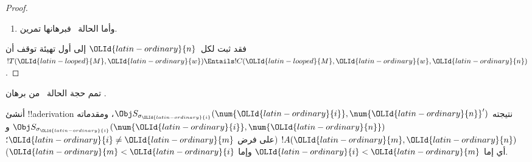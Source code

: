 \documentclass[../../../include/open-logic-section]{subfiles}
\begin{document}
\begin{proof}
\begin{enumerate}
\begin{align*}
& \qquad   (\Obj Q_{{\OLId{latin-ordinary}{q}}'}(\num{{\OLMathNumeral{0}}}, \num{{\OLId{latin-ordinary}{n}}}') \land \Obj S_{\sigma'}(\num{{\OLMathNumeral{0}}}, \num{{\OLId{latin-ordinary}{n}}}') \land
!A(\num{{\OLMathNumeral{0}}}, \num{{\OLId{latin-ordinary}{n}}}))).
\intertext{وتستلزم كل من العبارتين}
&  \Obj Q_{{\OLId{latin-ordinary}{q}}'}(\num{{\OLId{latin-ordinary}{l}}}, \num{{\OLId{latin-ordinary}{n}}}') \land \Obj S_{\sigma'}(\num{{\OLId{latin-ordinary}{m}}},
  \num{{\OLId{latin-ordinary}{n}}}') \land {}\\
&\qquad \displaystyle\bigwedge_{\substack{{\OLMathNumeral{0}}\leq {\OLId{latin-ordinary}{i}}\leq {\OLId{latin-ordinary}{k}}\\{\OLId{latin-ordinary}{i}}\neq {\OLId{latin-ordinary}{m}}}}
  \Obj S_{\sigma_{\OLId{latin-ordinary}{i}}}(\num{{\OLId{latin-ordinary}{i}}}, \num{{\OLId{latin-ordinary}{n}}}') \land {} \\
& \qquad  \lforall[{\OLId{latin-ordinary}{x}}][(\num{{\OLId{latin-ordinary}{k}}} < {\OLId{latin-ordinary}{x}}
  \lif \Obj S_\TMblank({\OLId{latin-ordinary}{x}}, \num{{\OLId{latin-ordinary}{n}}}'))]
\end{align*}
على الوجه المتقدم. ففي الحالة الأولى
$\num{{\OLId{latin-ordinary}{l}}}'\ident\num{{\OLId{latin-ordinary}{l}}+{\OLMathNumeral{1}}}\ident\num{{\OLId{latin-ordinary}{m}}}$، وفي الثانية
$\num{{\OLId{latin-ordinary}{l}}}\ident\num{{\OLMathNumeral{0}}}$. والحاصل هو $!C({\OLId{latin-looped}{M}},{\OLId{latin-ordinary}{w}},{\OLId{latin-ordinary}{n}}+{\OLMathNumeral{1}})$ نفسه.

\item وأما الحالة~ فبرهانها تمرين.
\end{enumerate}
فقد ثبت لكل~${\OLId{latin-ordinary}{n}}$ إلى أول تهيئة توقف أن
$!T({\OLId{latin-looped}{M}},{\OLId{latin-ordinary}{w}})\Entails !C({\OLId{latin-looped}{M}},{\OLId{latin-ordinary}{w}},{\OLId{latin-ordinary}{n}})$.
\end{proof}

\begin{prob}
تمم حجة الحالة~ من برهان
.
\end{prob}

\begin{prob}
أنشئ !!a{derivation} نتيجته $\Obj S_{\sigma_{\OLId{latin-ordinary}{i}}}(\num{{\OLId{latin-ordinary}{i}}},\num{{\OLId{latin-ordinary}{n}}}')$، ومقدماته
$\Obj S_{\sigma_{\OLId{latin-ordinary}{i}}}(\num{{\OLId{latin-ordinary}{i}}},\num{{\OLId{latin-ordinary}{n}}})$ و$!A({\OLId{latin-ordinary}{m}},{\OLId{latin-ordinary}{n}})$ (على فرض
${\OLId{latin-ordinary}{i}}\neq {\OLId{latin-ordinary}{m}}$؛ أي إما ${\OLId{latin-ordinary}{i}}<{\OLId{latin-ordinary}{m}}$ وإما ${\OLId{latin-ordinary}{m}}<{\OLId{latin-ordinary}{i}}$).
\end{prob}
\end{document}

